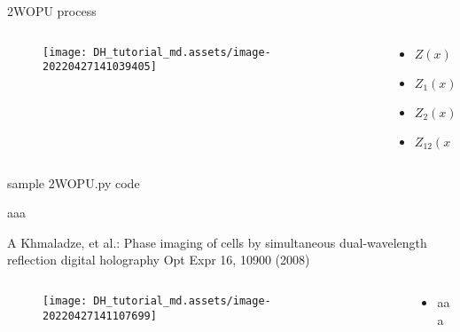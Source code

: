 \documentclass[t, aspectratio=169]{beamer}
\begin{document}
\begin{frame}{2WOPU process}
	\begin{columns}
		\begin{column}{0.6\textwidth}
			\vspace{-5 mm}
			\begin{figure}
				\texttt{[image: DH\_tutorial\_md.assets/image-20220427141039405]}
			\end{figure}
		\end{column}
		\begin{column}{0.4\textwidth}
			\begin{itemize}
				\item[a) ] $ Z(x) $
				\item[b) ] $ Z_1(x) $
				\item[c) ] $ Z_2(x) $
				\item[c) ] $ Z_{12}(x) $
			\end{itemize}
		\end{column}
	\end{columns}
\end{frame}


\begin{frame}[fragile]{sample 2WOPU.py code}
	\begin{semiverbatim}
aaa
	\end{semiverbatim}
\end{frame}


\begin{frame}{A Khmaladze, et al.: Phase imaging of cells by simultaneous dual-wavelength reflection digital holography}
	\vspace{-3 mm}
	\small Opt Expr 16, 10900 (2008)
	\begin{columns}
		\begin{column}{.6\textwidth}
			\begin{figure}
				\texttt{[image: DH\_tutorial\_md.assets/image-20220427141107699]}
			\end{figure}
		\end{column}
		\begin{column}{.4\textwidth}
			\begin{itemize}
				\item aaa
			\end{itemize}
		\end{column}
	\end{columns}
\end{frame}
\end{document}
